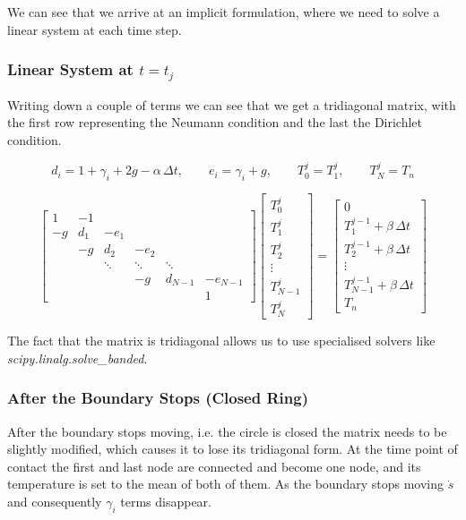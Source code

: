 We can see that we arrive at an implicit formulation, where we need to solve a linear system at each time step.

\subsubsection*{Linear System at $t = t_j$}

Writing down a couple of terms we can see that we get a tridiagonal matrix, with the first row representing the Neumann condition and the last the Dirichlet condition.  
 
\begin{equation*}
d_i = 1 + \gamma_i + 2g - \alpha\,\Delta t, \qquad e_i = \gamma_i + g,
\qquad
T_0^j = T_1^j, \qquad T_N^j = T_n
\end{equation*}

\begin{equation}
\label{eq:filament_linear_system}
\begin{bmatrix}
1 & -1 & & & & \\
-g & d_1 & -e_1 & & & \\
 & -g & d_2 & -e_2 & & \\
 & & \ddots & \ddots & \ddots & \\
 & & & -g & d_{N-1} & -e_{N-1} \\
 & & & & & 1
\end{bmatrix}
\begin{bmatrix}
T_0^j \\ T_1^j \\ T_2^j \\ \vdots \\ T_{N-1}^j \\ T_N^j
\end{bmatrix}
=
\begin{bmatrix}
0 \\ T_1^{j-1} + \beta\,\Delta t \\ T_2^{j-1} + \beta\,\Delta t \\ \vdots \\ T_{N-1}^{j-1} + \beta\,\Delta t \\ T_n
\end{bmatrix}
\end{equation}

The fact that the matrix is tridiagonal allows us to use specialised solvers like \textit{scipy.\allowbreak linalg.\allowbreak solve\_banded}.
 

\subsubsection*{After the Boundary Stops (Closed Ring)}
After the boundary stops moving, i.e. the circle is closed the matrix needs to be slightly modified, which causes it to lose its tridiagonal form. At the time point of contact the first and last node are connected and become one node, and its temperature is set to the mean of both of them. As the boundary stops moving $\dot{s}$ and consequently $\gamma_i$ terms disappear.
 
